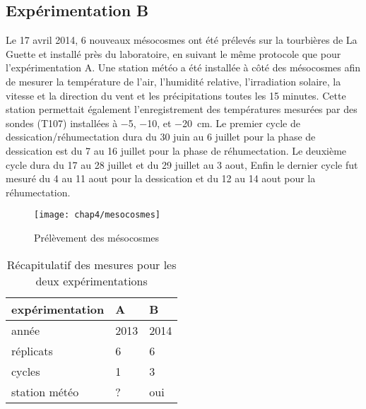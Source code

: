 \subsection{Expérimentation B}
Le 17 avril 2014, 6 nouveaux mésocosmes ont été prélevés sur la tourbières de La Guette et installé près du laboratoire, en suivant le même protocole que pour l'expérimentation A.
Une station météo a été installée à côté des mésocosmes afin de mesurer la température de l'air, l'humidité relative, l'irradiation solaire, la vitesse et la direction du vent et les précipitations toutes les 15 minutes.
Cette station permettait également l'enregistrement des températures mesurées par des sondes (T107) installées à \num{-5}, \num{-10}, et \SI{-20}{\centi\metre}.
Le premier cycle de dessication/réhumectation dura du 30 juin au 6 juillet pour la phase de dessication est du 7 au 16 juillet pour la phase de réhumectation.
Le deuxième cycle dura du 17 au 28 juillet et du 29 juillet au 3 aout, 
Enfin le dernier cycle fut mesuré du 4 au 11 aout pour la dessication et du 12 au 14 aout pour la réhumectation.



\begin{figure}
\centering
\texttt{[image: chap4/mesocosmes]}
\caption{Prélèvement des mésocosmes}
\label{fig:mesophoto}
\end{figure}


\begin{table}
\centering
\caption{Récapitulatif des mesures pour les deux expérimentations}
\label{table:recap_hm}
\begin{tabular}{lll}\toprule
expérimentation & A & B \\ \midrule
année & 2013 & 2014 \\
réplicats & 6 & 6 \\
cycles & 1 & 3 \\
station météo & ? & oui\\

\bottomrule
\end{tabular}
\end{table}


